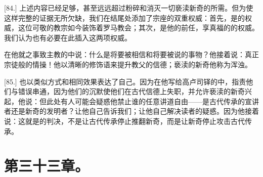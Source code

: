 \par

[84.] 上述内容已经足够，甚至远远超过粉碎和消灭一切亵渎新奇的所需。但为使这样完整的证据无所欠缺，我们在结尾处添加了宗座的双重权威：首先，是的权威，这位可敬的教宗如今装饰着罗马教会；其次，是他的前任，享真福的的权威。我们认为也有必要在此插入这两项权威。\par

在他就之事致主教的中说：什么是将要被相信和将要被说的事物？他接着说：真正宗徒般的情操！他以清晰的修饰语来提升教父的信德；亵渎的新奇他称为浑浊。\par

[85.] 也以类似方式和相同效果表达了自己。因为在他写给高卢司铎的中，指责他们与错误串通，因为他们的沉默使他们在古代信德上失职，并允许亵渎的新奇兴起，他说：但此处有人可能会疑惑他禁止谁的任意讲道自由——是古代传承的宣讲者还是新奇的发明者？让他自己告诉我们；让他自己解决读者的疑惑。因为他接着说：这就是的判决，不是让古代传承停止推翻新奇，而是让新奇停止攻击古代传承。\par


\section{第三十三章。}

\par

